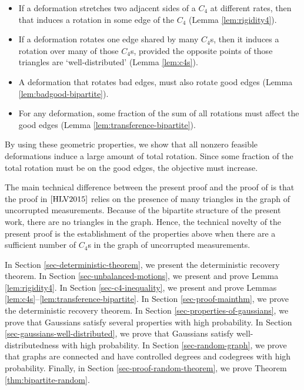 \begin{itemize}
\item If a deformation stretches two adjacent sides of a $C_4$ at different rates, then that induces a rotation in some edge %
of the $C_4$ (Lemma \ref{lem:rigidity4}).  
\item If a deformation rotates one edge shared by many $C_4$s, then it induces a rotation over many of those $C_4$s, provided the opposite points of those triangles are `well-distributed' (Lemma \ref{lem:c4s}).
\item A deformation that rotates bad edges, must also rotate good edges (Lemma \ref{lem:badgood-bipartite}).
\item For any deformation, some fraction of the sum of all rotations must  affect the good edges (Lemma \ref{lem:transference-bipartite}).
\end{itemize}
By using these geometric properties, we show that all nonzero feasible deformations induce a
large amount of total rotation. Since some fraction of the total rotation must be on the good edges,  the objective must increase. 

The main technical difference between the present proof and the proof of \cite{HLV2015} is that the proof in $\cite{HLV2015}$ relies on the presence of many triangles in the graph of uncorrupted measurements.  Because of the bipartite structure of the present work, there are no triangles in the graph.  Hence, the technical novelty of the present proof is the establishment of the properties above when there are a sufficient number of $C_4$s in the graph of uncorrupted measurements.  

In Section \ref{sec-deterministic-theorem}, we present the deterministic recovery theorem.  In Section \ref{sec-unbalanced-motions}, we present and prove Lemma \ref{lem:rigidity4}.  In Section \ref{sec-c4-inequality}, we present and prove Lemmas \ref{lem:c4s}--\ref{lem:transference-bipartite}.  In Section \ref{sec-proof-mainthm}, we prove the deterministic recovery theorem.  In Section \ref{sec-properties-of-gaussians}, we prove that Gaussians satisfy several properties with high probability. In Section \ref{sec-gaussians-well-distributed}, we prove that Gaussians satisfy well-distributedness with high probability.  In Section \ref{sec-random-graph}, we prove that \erdosrenyi graphs are connected and have controlled degrees and codegrees with high probability.  Finally, in Section \ref{sec-proof-random-theorem}, we prove Theorem \ref{thm:bipartite-random}.


